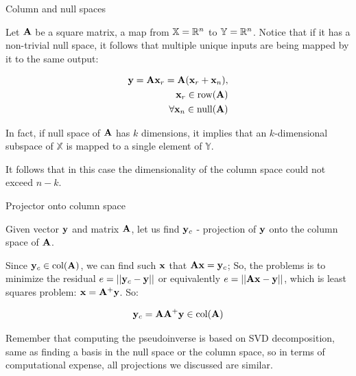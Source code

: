 \documentclass{beamer}
\begin{document}
\begin{frame}{Column and null spaces}
	\begin{flushleft}
		
		Let $\mathbf{A}$ be a square matrix, a map from $\mathbb{X} = \mathbb{R}^n$ to $\mathbb{Y} = \mathbb{R}^n$. 
		Notice that if it has a non-trivial null space, it follows that multiple unique inputs are being mapped by it to the same output:
		
		\begin{equation}
			\begin{aligned}
				\mathbf{y} = \mathbf{A} \mathbf{x}_r = \mathbf{A} (\mathbf{x}_r + \mathbf{x}_n), \\
				\mathbf{x}_r \in \text{row}(\mathbf{A}) \\
				\forall \mathbf{x}_n \in \text{null}(\mathbf{A}) \\
			\end{aligned}
		\end{equation}
		
		In fact, if null space of $\mathbf{A}$ has $k$ dimensions, it implies that an $k$-dimensional subspace of $\mathbb{X}$ is mapped to a single element of $\mathbb{Y}$. 
		
		\bigskip
		
		It follows that in this case the dimensionality of the column space could not exceed $n-k$.
		
	\end{flushleft}
\end{frame}



\begin{frame}{Projector onto column space}
	\begin{flushleft}
		
		Given vector $\mathbf{y}$ and matrix $\mathbf{A}$, let us find $\mathbf{y}_c$ - projection of $\mathbf{y}$ onto the column space of $\mathbf{A}$.
		
		\bigskip
		
		Since $\mathbf{y}_c \in \text{col}(\mathbf{A})$, we can find such $\mathbf{x}$ that $\mathbf{A}\mathbf{x} = \mathbf{y}_c$; So, the problems is to minimize the residual $e = || \mathbf{y}_c - \mathbf{y} ||$ or equivalently $e =  || \mathbf{A}\mathbf{x} - \mathbf{y} ||$, which is least squares problem: $\mathbf{x} = \mathbf{A}^+ \mathbf{y}$. So:
		
		\begin{equation}
			\mathbf{y}_c = \mathbf{A}\mathbf{A}^+ \mathbf{y} \in \text{col}(\mathbf{A})
		\end{equation}
		
		Remember that computing the pseudoinverse is based on SVD decomposition, same as finding a basis in the null space or the column space, so in terms of computational expense, all projections we discussed are similar.
		
	\end{flushleft}
\end{frame}
\end{document}
